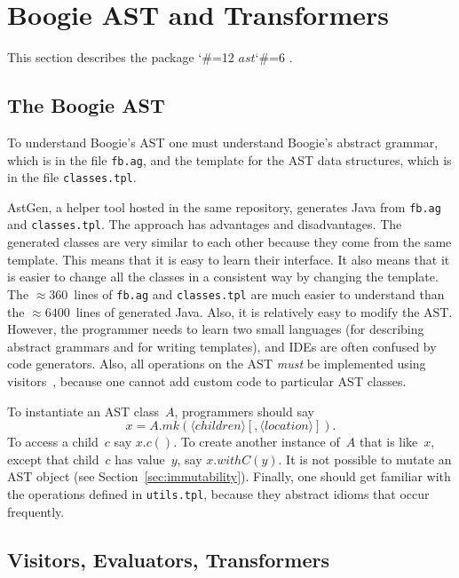 \documentclass{llncs}
\newcommand{\methodHelper}[1]{$\mathit{#1}$\catcode`\#=6 }
\newcommand{\method}{\catcode`\#=12 \methodHelper}
\begin{document}
\section{Boogie AST and Transformers} %
\label{sec:ast}

This section describes the package \method{ast}.

\subsection{The Boogie AST} %

To understand Boogie's AST one must understand Boogie's abstract grammar,
which is in the file \texttt{fb.ag}, and the template for the AST data
structures, which is in the file \texttt{classes.tpl}.

AstGen, a helper tool hosted in the same repository, generates Java from
\texttt{fb.ag} and \texttt{classes.tpl}.  The approach has advantages and
disadvantages.  The generated classes are very similar to each other
because they come from the same template. This means that it is easy to
learn their interface.  It also means that it is easier to change all the
classes in a consistent way by changing the template.  The
$\approx360$~lines of \texttt{fb.ag} and \texttt{classes.tpl} are much
easier to understand than the $\approx6400$~lines of generated Java. Also,
it is relatively easy to modify the AST\null.  However, the programmer
needs to learn two small languages (for describing abstract grammars and
for writing templates), and IDEs are often confused by code generators.
Also, all operations on the AST \emph{must} be implemented using
visitors~\cite[Chapter~5]{gamma1995}, because one cannot add custom code
to particular AST classes.

To instantiate an AST class~$A$, programmers should say
\[x=A.\mathit{mk}(\langle\mathit{children}\rangle[,\langle\mathit{location}\rangle]).\]
To access a child~$c$ say $x.c()$. To create another instance of~$A$ that
is like~$x$, except that child~$c$ has value~$y$, say $x.withC(y)$.  It is
not possible to mutate an AST object (see Section~\ref{sec:immutability}).
Finally, one should get familiar with the operations defined in
\texttt{utils.tpl}, because they abstract idioms that occur frequently.

\subsection{Visitors, Evaluators, Transformers} %
\label{sec:visitors}
\end{document}
